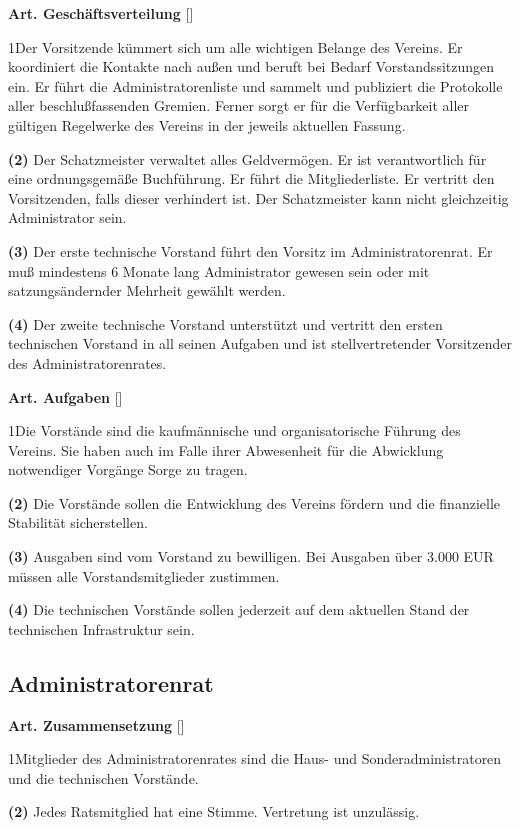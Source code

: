 \documentclass[12pt]{article}
\newcommand{\UAbschnitt}[1]{\subsection{#1}}
\newcommand{\Satz}[2]{

\begin{samepage}
{\bf (#1)} #2
\end{samepage}
}
\newenvironment{Artikel}[2]{
\bigskip \centerline{{\bf Art. #1} [#2]}
\nopagebreak
}{
}
\begin{document}
\begin{Artikel}{23}{Geschäftsverteilung}

\Satz{1}{Der Vorsitzende kümmert sich um alle wichtigen Belange des Vereins. Er
koordiniert die Kontakte nach außen und beruft bei Bedarf Vorstandssitzungen
ein. Er führt die Administratorenliste und sammelt und publiziert die
Protokolle aller beschlußfassenden Gremien. Ferner sorgt er für die
Verfügbarkeit aller gültigen Regelwerke des Vereins in der jeweils aktuellen
Fassung.}

\Satz{2}{Der Schatzmeister verwaltet alles Geldvermögen. Er ist verantwortlich
für eine ordnungsgemäße Buchführung. Er führt die Mitgliederliste. Er vertritt
den Vorsitzenden, falls dieser verhindert ist. Der Schatzmeister kann nicht
gleichzeitig Administrator sein.}

\Satz{3}{Der erste technische Vorstand führt den Vorsitz im Administratorenrat.
Er muß mindestens 6 Monate lang Administrator gewesen sein oder mit
satzungsändernder Mehrheit gewählt werden.}

\Satz{4}{Der zweite technische Vorstand unterstützt und vertritt den ersten
technischen Vorstand in all seinen Aufgaben und ist stellvertretender
Vorsitzender des Administratorenrates.}

\end{Artikel}

\begin{Artikel}{24}{Aufgaben}

\Satz{1}{Die Vorstände sind die kaufmännische und organisatorische 
Führung des Vereins. Sie haben auch im Falle ihrer Abwesenheit für die 
Abwicklung notwendiger Vorgänge Sorge zu tragen.}

\Satz{2}{Die Vorstände sollen die Entwicklung des Vereins fördern und die
finanzielle Stabilität sicherstellen.}

\Satz{3}{Ausgaben sind vom Vorstand zu bewilligen. Bei Ausgaben über 3.000 EUR
müssen alle Vorstandsmitglieder zustimmen.}

\Satz{4}{Die technischen Vorstände sollen jederzeit auf dem aktuellen Stand der
technischen Infrastruktur sein.}

\end{Artikel}

\UAbschnitt{Administratorenrat}

\begin{Artikel}{25}{Zusammensetzung}

\Satz{1}{Mitglieder des Administratorenrates sind die Haus- und
Sonderadministratoren und die technischen Vorstände.}

\Satz{2}{Jedes Ratsmitglied hat eine Stimme. Vertretung ist unzulässig.}

\end{Artikel}
\end{document}
